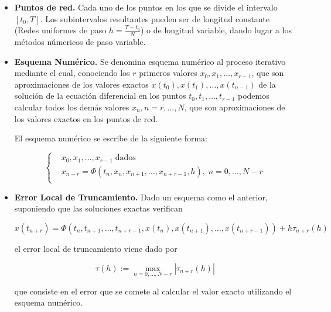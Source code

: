 \begin{itemize}

		\item \textbf{Puntos de red.} Cada uno de los puntos en los que se
				divide el intervalo $[t_0, T]$. Los subintervalos resultantes
				pueden ser de longitud constante (Redes uniformes de paso
				$h=\frac{T-t_0}{N}$) o de longitud variable, dando lugar a
				los métodos númericos de paso variable.

		\item \textbf{Esquema Numérico.} Se denomina esquema numérico al proceso
				iterativo mediante el cual, conociendo los $r$ primeros valores
				$x_0, x_1, \ldots, x_{r-1}$, que son aproximaciones de los
				valores exactos $x(t_0),x(t_1),\ldots,x(t_{n-1})$ de la solución
				de la ecuación diferencial en los puntos $t_0, t_1, \ldots,
				t_{r-1}$ podemos calcular todos los demás valores $x_n, n =
				r,\ldots,N$, que son aproximaciones de los valores exactos en
				los puntos de red.

				El esquema numérico se escribe de la siguiente forma:

				\begin{equation}
					\left\{ \begin{aligned}
							& x_0,x_1,\ldots,x_{r-1} \; \textrm{dados} \\
							& x_{n-r} = \Phi
							(t_n,x_n,x_{n+1},\ldots,x_{n+r-1},h), \; n =
							0,\ldots,N-r \\
					\end{aligned} \right.
				\end{equation}

		\item \textbf{Error Local de Truncamiento.} Dado un esquema como el
				anterior, suponiendo que las soluciones exactas verifican

				\begin{equation}
						x(t_{n+r}) = \Phi (t_n,
						t_{n+1},\ldots,t_{n+r-1},x(t_n),x(t_{n+1}),\ldots,x(t_{n+r-1}))
						+ h\tau_{n+r}(h)
				\end{equation}

				el error local de truncamiento viene dado por

				\begin{equation}
						\tau (h) := \max_{n=0,\ldots,N-r}|\tau_{n+r}(h)|	
				\end{equation}

				que consiste en el error que se comete al calcular el valor
				exacto utilizando el esquema numérico.


\end{itemize}
